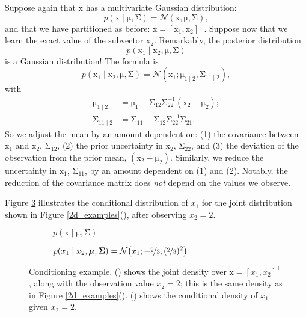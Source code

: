 \documentclass{article}
\newcommand{\given}{\mid}
\newcommand{\mc}[1]{\mathcal{#1}}
\newcommand{\inv}{^{-1}}
\newcommand{\trans}{^\top}
\newcommand{\mat}[1]{\bm{\mathrm{#1}}}
\renewcommand{\vec}[1]{\bm{\mathrm{#1}}}
\begin{document}
Suppose again that $\vec{x}$ has a multivariate Gaussian distribution:
\begin{equation*}
  p(\vec{x} \given \vec{\mu}, \mat{\Sigma})
  =
  \mc{N}(\vec{x}, \vec{\mu}, \mat{\Sigma}),
\end{equation*}
and that we have partitioned as before: $\vec{x} = [\vec{x}_1,
  \vec{x}_2]\trans$.  Suppose now that we learn the exact value of the
subvector $\vec{x}_2$.  Remarkably, the posterior distribution
\begin{equation*}
  p(\vec{x}_1 \given \vec{x}_2, \vec{\mu}, \mat{\Sigma})
\end{equation*}
is a Gaussian distribution!  The formula is
\begin{equation*}
  p(\vec{x}_1 \given \vec{x}_2, \vec{\mu}, \mat{\Sigma})
  =
  \mc{N}(\vec{x}_1; \vec{\mu}_{1 \given 2}, \mat{\Sigma}_{11 \given 2}),
\end{equation*}
with
\begin{align*}
  \vec{\mu}_{1 \given 2}
  &=
  \vec{\mu}_1 + \mat{\Sigma}_{12}\mat{\Sigma}_{22}\inv (\vec{x}_2 - \vec{\mu}_2);
  \\
  \mat{\Sigma}_{11 \given 2}
  &=
  \mat{\Sigma}_{11} - \mat{\Sigma}_{12}\mat{\Sigma}_{22}\inv \mat{\Sigma}_{21}.
\end{align*}
So we adjust the mean by an amount dependent on: (1) the covariance
between $\vec{x}_1$ and $\vec{x}_2$, $\mat{\Sigma}_{12}$, (2) the
prior uncertainty in $\vec{x}_2$, $\mat{\Sigma}_{22}$, and (3) the
deviation of the observation from the prior mean, $(\vec{x}_2 -
\vec{\mu}_2)$.  Similarly, we reduce the uncertainty in $\vec{x}_1$,
$\mat{\Sigma}_{11}$, by an amount dependent on (1) and (2).  Notably,
the reduction of the covariance matrix does \emph{not} depend on the
values we observe.

Figure \ref{conditional_example} illustrates the conditional
distribution of $x_1$ for the joint distribution shown in Figure
\ref{2d_examples}(), after observing $x_2 = 2$.

\begin{figure}
  \centering
  \begin{subfigure}[t]{0.49\textwidth}
    
    \caption{$p(\vec{x} \given \vec{\mu}, \mat{\Sigma})$}
    \label{conditional_2d_pdf}
  \end{subfigure}
  \begin{subfigure}[t]{0.49\textwidth}
    
    \caption{$p(x_1 \given x_2, \vec{\mu}, \mat{\Sigma}) =
      \mc{N}\bigl(x_1; -\nicefrac{2}{3}, (\nicefrac{2}{3})^2\bigr)$}
    \label{conditional_pdf}
  \end{subfigure}
  \caption{Conditioning example.  () shows
    the joint density over $\vec{x} = [x_1, x_2]\trans$, along with
    the observation value $x_2 = 2$; this is the same density as in
    Figure \ref{2d_examples}().
    () shows the conditional density of
    $x_1$ given $x_2 = 2$.}
  \label{conditional_example}
\end{figure}
\end{document}
